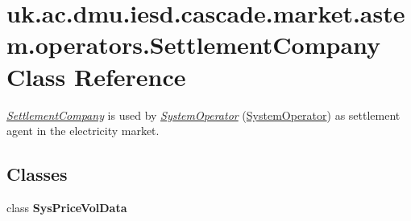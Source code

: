 \hypertarget{classuk_1_1ac_1_1dmu_1_1iesd_1_1cascade_1_1market_1_1astem_1_1operators_1_1_settlement_company}{\section{uk.\-ac.\-dmu.\-iesd.\-cascade.\-market.\-astem.\-operators.\-Settlement\-Company Class Reference}
\label{classuk_1_1ac_1_1dmu_1_1iesd_1_1cascade_1_1market_1_1astem_1_1operators_1_1_settlement_company}
}


{\itshape \hyperlink{classuk_1_1ac_1_1dmu_1_1iesd_1_1cascade_1_1market_1_1astem_1_1operators_1_1_settlement_company}{Settlement\-Company}} is used by {\itshape \hyperlink{classuk_1_1ac_1_1dmu_1_1iesd_1_1cascade_1_1market_1_1astem_1_1operators_1_1_system_operator}{System\-Operator}} (\hyperlink{classuk_1_1ac_1_1dmu_1_1iesd_1_1cascade_1_1market_1_1astem_1_1operators_1_1_system_operator}{System\-Operator}) as settlement agent in the electricity market.  


\subsection*{Classes}
\begin{DoxyCompactItemize}
\item 
class {\bfseries Sys\-Price\-Vol\-Data}
\end{DoxyCompactItemize}
